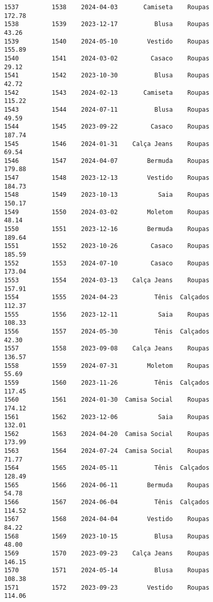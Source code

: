 \documentclass[11pt]{article}
\begin{document}
\begin{Verbatim}[commandchars=\\\{\}]
1537         1538    2024-04-03       Camiseta    Roupas          172.78   
1538         1539    2023-12-17          Blusa    Roupas           43.26   
1539         1540    2024-05-10        Vestido    Roupas          155.89   
1540         1541    2024-03-02         Casaco    Roupas           29.12   
1541         1542    2023-10-30          Blusa    Roupas           42.72   
1542         1543    2024-02-13       Camiseta    Roupas          115.22   
1543         1544    2024-07-11          Blusa    Roupas           49.59   
1544         1545    2023-09-22         Casaco    Roupas          187.74   
1545         1546    2024-01-31    Calça Jeans    Roupas           69.54   
1546         1547    2024-04-07        Bermuda    Roupas          179.88   
1547         1548    2023-12-13        Vestido    Roupas          184.73   
1548         1549    2023-10-13           Saia    Roupas          150.17   
1549         1550    2024-03-02        Moletom    Roupas           48.14   
1550         1551    2023-12-16        Bermuda    Roupas          189.64   
1551         1552    2023-10-26         Casaco    Roupas          185.59   
1552         1553    2024-07-10         Casaco    Roupas          173.04   
1553         1554    2024-03-13    Calça Jeans    Roupas          157.91   
1554         1555    2024-04-23          Tênis  Calçados          112.37   
1555         1556    2023-12-11           Saia    Roupas          108.33   
1556         1557    2024-05-30          Tênis  Calçados           42.30   
1557         1558    2023-09-08    Calça Jeans    Roupas          136.57   
1558         1559    2024-07-31        Moletom    Roupas           55.69   
1559         1560    2023-11-26          Tênis  Calçados          117.45   
1560         1561    2024-01-30  Camisa Social    Roupas          174.12   
1561         1562    2023-12-06           Saia    Roupas          132.01   
1562         1563    2024-04-20  Camisa Social    Roupas          173.99   
1563         1564    2024-07-24  Camisa Social    Roupas           71.77   
1564         1565    2024-05-11          Tênis  Calçados          128.49   
1565         1566    2024-06-11        Bermuda    Roupas           54.78   
1566         1567    2024-06-04          Tênis  Calçados          114.52   
1567         1568    2024-04-04        Vestido    Roupas           84.22   
1568         1569    2023-10-15          Blusa    Roupas           48.00   
1569         1570    2023-09-23    Calça Jeans    Roupas          146.15   
1570         1571    2024-05-14          Blusa    Roupas          108.38   
1571         1572    2023-09-23        Vestido    Roupas          114.06   

\end{Verbatim}
\end{document}

